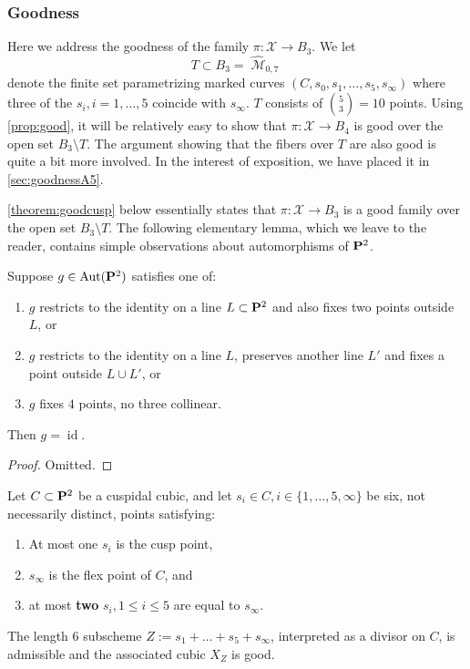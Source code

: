 \documentclass[12pt,reqno]{amsart}
\DeclareMathOperator{\id}{id}
\DeclareMathOperator{\M}{\mathcal{M}}
\renewcommand{\to}{{\longrightarrow}}
\numberwithin{equation}{section}
\newcommand{\hM}{\widehat{\M}}
\begin{document}
\subsubsection{Goodness}
\label{sec:goodness3}

Here we address the goodness of the family
$\pi: \mathcal{X} \to B_{3}$. We let $$T \subset B_{3} = \hM_{0,7}$$
denote the finite set parametrizing marked curves
$(C, s_{0}, s_{1}, \dots, s_{5}, s_{\infty})$ where three of the
$s_{i}, i=1, \dots, 5$ coincide with $s_{\infty}$.  $T$ consists of
${5 \choose 3 } = 10$ points.  Using \autoref{prop:good}, it will be
relatively easy to show that $\pi: \mathcal{X} \to B_{4}$ is good over
the open set $B_{3} \setminus T$.  The argument showing that the
fibers over $T$ are also good is quite a bit more involved.  In the
interest of exposition, we have placed it in \autoref{sec:goodnessA5}.




\autoref{theorem:goodcusp} below essentially states that
$\pi : \mathcal{X} \to B_{3}$ is a good family over the open set
$B_{3} \setminus T$. The following elementary lemma, which we leave to
the reader, contains simple observations about automorphisms of
$\P^{2}$.

\begin{lemma}
  \label{lemma:identity} Suppose $g \in \Aut(\P^{2})$ satisfies one of:
  \begin{enumerate}
  \item $g$ restricts to the identity on a line $L \subset \P^{2}$ and
    also fixes two points outside $L$, or
  \item $g$ restricts to the identity on a line $L$, preserves another
    line $L'$ and fixes a point outside $L \cup L'$, or
  \item $g$ fixes $4$ points, no three collinear.
  \end{enumerate}
  Then $g = \id$.
\end{lemma}

\begin{proof}
  Omitted.
\end{proof}

\begin{theorem}
  \label{theorem:goodcusp}
  Let $C \subset \P^{2}$ be a cuspidal cubic, and let
  $s_{i} \in C, i \in \{1, \dots, 5, \infty \}$ be six, not
  necessarily distinct, points satisfying:
  \begin{enumerate}
  \item At most one $s_{i}$ is the cusp point,
  \item $s_{\infty}$ is the flex point of $C$, and
  \item at most {\bf two} $s_{i}, 1 \leq i \leq 5$ are equal to $s_{\infty}$.
  \end{enumerate}
  
  The length $6$ subscheme $Z := s_{1} + \dots + s_{5} + s_{\infty}$,
  interpreted as a divisor on $C$, is admissible and the associated
  cubic $X_{Z}$ is good.
\end{theorem}
\end{document}
